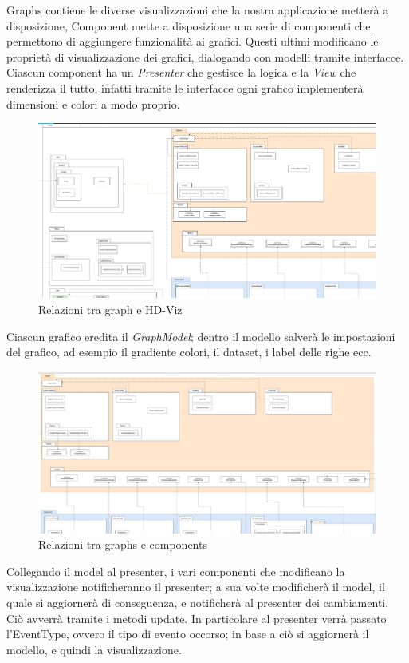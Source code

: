 \documentclass[../manuale_sviluppatore.tex]{subfiles}
\begin{document}
Graphs contiene le diverse visualizzazioni che la nostra applicazione metterà a disposizione, Component mette a disposizione una serie di componenti che permettono di aggiungere funzionalità ai grafici.
Questi ultimi modificano le proprietà di visualizzazione dei grafici, dialogando con modelli tramite interfacce. Ciascun component ha un \emph{Presenter} che gestisce la logica e la \emph{View} che renderizza il tutto,
infatti tramite le interfacce ogni grafico implementerà dimensioni e colori a modo proprio.

\begin{figure}[H]
	\centering
	\includegraphics[width=18cm]{img/graph-e-hdviz.jpg}
	\caption{Relazioni tra graph e HD-Viz}
\end{figure}


Ciascun grafico eredita il \emph{GraphModel}; dentro il modello salverà le impostazioni del grafico, ad esempio il gradiente colori, il dataset, i label delle righe ecc.

\begin{figure}[H]
	\centering
	\includegraphics[width=18cm]{img/graphs-e-components.jpg}
	\caption{Relazioni tra graphs e components}
\end{figure}


Collegando il model al presenter, i vari componenti che modificano la visualizzazione notificheranno il presenter; a sua volte modificherà il model, il quale si aggiornerà di conseguenza, 
e notificherà al presenter dei cambiamenti.
Ciò avverrà tramite i metodi update. In particolare al presenter verrà passato l'EventType, ovvero il tipo di evento occorso; in base a ciò si aggiornerà il modello, e quindi la visualizzazione.
\end{document}
